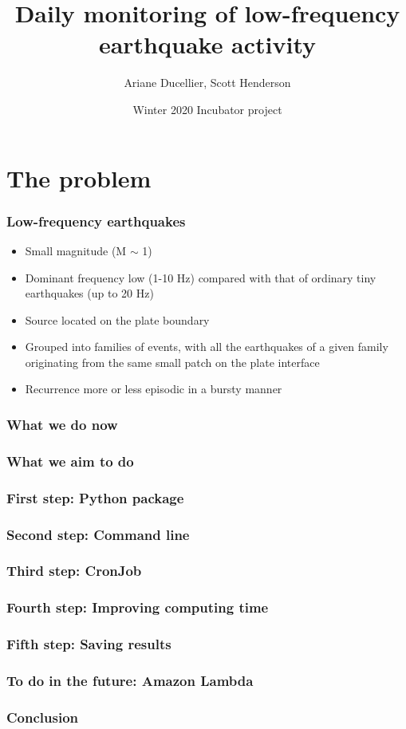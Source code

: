 \documentclass{beamer}
\title[Daily monitoring of low-frequency earthquake activity]{Daily monitoring of low-frequency earthquake activity}
\author{Ariane Ducellier, Scott Henderson}
\date{Winter 2020 Incubator project}
\begin{document}
	\begin{frame}
		\titlepage
	\end{frame}

	\section{The problem}
	
	\begin{frame}
		\frametitle{Low-frequency earthquakes}
		\begin{itemize}
			\item Small magnitude (M $\sim$ 1)
			\item Dominant frequency low (1-10 Hz) compared with that of ordinary tiny earthquakes (up to 20 Hz)
			\item Source located on the plate boundary
			\item Grouped into families of events, with all the earthquakes of a given family originating from the same small patch on the plate interface
			\item Recurrence more or less episodic in a bursty manner
		\end{itemize}
	\end{frame}

	\begin{frame}
		\frametitle{What we do now}
	\end{frame}

	\begin{frame}
		\frametitle{What we aim to do}
	\end{frame}

	\begin{frame}
		\frametitle{First step: Python package}
	\end{frame}

	\begin{frame}
		\frametitle{Second step: Command line}
	\end{frame}

	\begin{frame}
		\frametitle{Third step: CronJob}
	\end{frame}

	\begin{frame}
		\frametitle{Fourth step: Improving computing time}
	\end{frame}

	\begin{frame}
		\frametitle{Fifth step: Saving results}
	\end{frame}

	\begin{frame}
		\frametitle{To do in the future: Amazon Lambda}
	\end{frame}

	\begin{frame}
		\frametitle{Conclusion}
	\end{frame}
\end{document}
